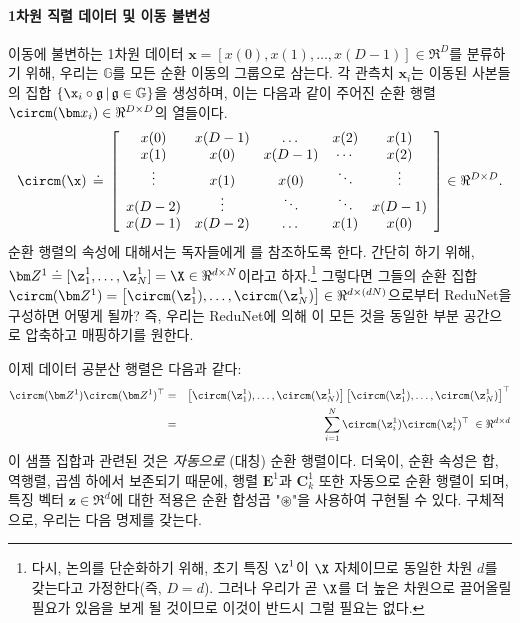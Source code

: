 \documentclass[../../book-main_ko.tex]{subfiles}
\begin{document}
\paragraph{1차원 직렬 데이터 및 이동 불변성} 이동에 불변하는 1차원 데이터 $\bm x = [x(0), x(1), \ldots, x(D-1)] \in \Re^D$를 분류하기 위해, 우리는 $\mathbb{G}$를 모든 순환 이동의 그룹으로 삼는다. 각 관측치 $\bm x_i$는 이동된 사본들의 집합 $\{ \x_i \circ \mathfrak{g} \, | \, \mathfrak{g} \in \mathbb G \}$을 생성하며, 이는 다음과 같이 주어진 순환 행렬 $\circm(\bm x_i) \in \Re^{D \times D}$의 열들이다.
\begin{equation}
\circm(\x) \,\doteq\, \left[ \begin{array}{ccccc} x(0) & x(D-1) & \dots & x(2) & x(1) \\ x(1) & x(0) & x(D-1) & \cdots & x(2) \\ \vdots & x(1) & x(0) &\ddots & \vdots \\ x(D-2) &  \vdots & \ddots & \ddots & x(D-1) \\ x(D-1) & x(D-2) & \dots & x(1) & x(0)   \end{array} \right]  \in \Re^{D \times D}.
\end{equation}
순환 행렬의 속성에 대해서는 독자들에게 \cite{Kra2012OnCM}를 참조하도록 한다. 간단히 하기 위해, $\bm Z^1 \doteq [ \z_{1}^1, \dots, \z_{N}^1 ] = \X \in \Re^{d \times N}$이라고 하자.\footnote{다시, 논의를 단순화하기 위해, 초기 특징 $\Z^1$이 $\X$ 자체이므로 동일한 차원 $d$를 갖는다고 가정한다(즉, $D=d$). 그러나 우리가 곧 $\X$를 더 높은 차원으로 끌어올릴 필요가 있음을 보게 될 것이므로 이것이 반드시 그럴 필요는 없다.} 그렇다면 그들의 순환 집합 $\circm(\bm Z^1) = \left[ \circm(\z_{1}^1), \dots, \circm(\z_{N}^1) \right] \in \Re^{d \times (dN)}$으로부터 ReduNet을 구성하면 어떻게 될까? 즉, 우리는 ReduNet에 의해 이 모든 것을 동일한 부분 공간으로 압축하고 매핑하기를 원한다.

이제 데이터 공분산 행렬은 다음과 같다:
\begin{eqnarray}
\circm(\bm Z^1) \circm(\bm Z^1)^\top 
&=& \left[ \circm(\z_{1}^1), \dots, \circm(\z_{N}^1) \right] \left[ \circm(\z_{1}^1), \dots, \circm (\z_{N}^1) \right]^\top \nonumber \\
&=& \sum_{i =1}^N \circm(\z_{i}^1) \circm(\z_{i}^1)^\top \;\in \Re^{d\times d} 
\end{eqnarray}
이 샘플 집합과 관련된 것은 {\em 자동으로} (대칭) 순환 행렬이다. 더욱이, 순환 속성은 합, 역행렬, 곱셈 하에서 보존되기 때문에, 행렬 $\bm E^1$과 $\bm C^1_k$ 또한 자동으로 순환 행렬이 되며, 특징 벡터 $\bm z \in \Re^d$에 대한 적용은 순환 합성곱 "$\circledast$"을 사용하여 구현될 수 있다.
구체적으로, 우리는 다음 명제를 갖는다.
\end{document}
